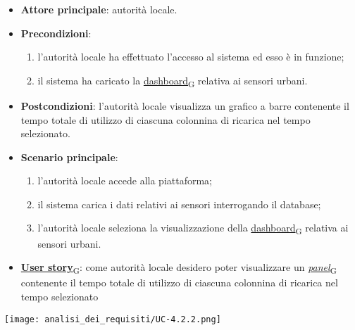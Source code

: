 \newpage
{}
\begin{itemize}
	\item \textbf{Attore principale}: autorità locale.
	\item \textbf{Precondizioni}:
	      \begin{enumerate}
		      \item l'autorità locale ha effettuato l'accesso al sistema ed esso è in funzione;
		      \item il sistema ha caricato la \href{https://7last.github.io/docs/pb/documentazione-interna/glossario\#dashboard}{dashboard\textsubscript{G}} relativa ai sensori urbani.
	      \end{enumerate}
	\item \textbf{Postcondizioni}: l'autorità locale visualizza un grafico a barre contenente il tempo totale di utilizzo di ciascuna colonnina di ricarica nel tempo selezionato.
	\item \textbf{Scenario principale}:
	      \begin{enumerate}
		      \item l'autorità locale accede alla piattaforma;
		      \item il sistema carica i dati relativi ai sensori interrogando il database;
		      \item l'autorità locale seleziona la visualizzazione della \href{https://7last.github.io/docs/pb/documentazione-interna/glossario\#dashboard}{dashboard\textsubscript{G}} relativa ai sensori urbani.
	      \end{enumerate}
	\item \href{https://7last.github.io/docs/pb/documentazione-interna/glossario\#user-story}{\textbf{User story}\textsubscript{G}}:
	      come autorità locale desidero poter visualizzare un \href{https://7last.github.io/docs/pb/documentazione-interna/glossario\#panel}{\textit{panel}\textsubscript{G}} contenente il tempo totale di utilizzo di ciascuna colonnina di ricarica nel tempo selezionato
\end{itemize}
\begin{center}
	\texttt{[image: analisi\_dei\_requisiti/UC-4.2.2.png]}
\end{center}


